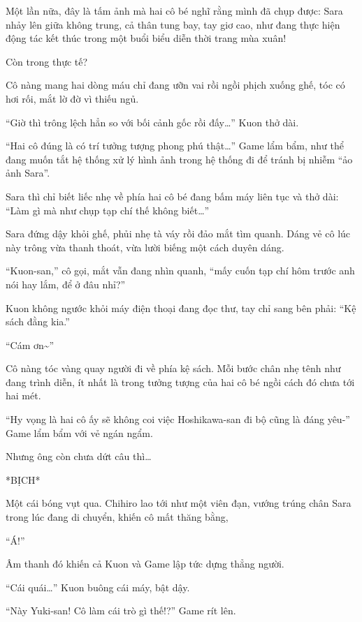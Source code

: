 \documentclass[../main.tex]{subfiles}
\begin{document}
Một lần nữa, đây là tấm ảnh mà hai cô bé nghĩ rằng mình đã chụp được: Sara nhảy lên giữa không trung, cả thân tung bay, tay giơ cao, như đang thực hiện động tác kết thúc trong một buổi biểu diễn thời trang mùa xuân!


Còn trong thực tế?

Cô nàng mang hai dòng máu chỉ đang ưỡn vai rồi ngồi phịch xuống ghế, tóc có hơi rối, mắt lờ đờ vì thiếu ngủ.

``Giờ thì trông lệch hẳn so với bối cảnh gốc rồi đấy\dots'' Kuon thở dài.

``Hai cô đúng là có trí tưởng tượng phong phú thật\dots'' Game lẩm bẩm, như thể đang muốn tắt hệ thống xử lý hình ảnh trong hệ thống đi để tránh bị nhiễm ``ảo ảnh Sara''.

Sara thì chỉ biết liếc nhẹ về phía hai cô bé đang bấm máy liên tục và thở dài: ``Làm gì mà như chụp tạp chí thế không biết\dots''

\ct

Sara đứng dậy khỏi ghế, phủi nhẹ tà váy rồi đảo mắt tìm quanh. Dáng vẻ cô lúc này trông vừa thanh thoát, vừa lười biếng một cách duyên dáng.

``Kuon-san,'' cô gọi, mắt vẫn đang nhìn quanh, ``mấy cuốn tạp chí hôm trước anh nói hay lắm, để ở đâu nhỉ?''

Kuon không ngước khỏi máy điện thoại đang đọc thư, tay chỉ sang bên phải: ``Kệ sách đằng kia.''

``Cám ơn\~{}''

Cô nàng tóc vàng quay người đi về phía kệ sách. Mỗi bước chân nhẹ tênh như đang trình diễn, ít nhất là trong tưởng tượng của hai cô bé ngồi cách đó chưa tới hai mét.

``Hy vọng là hai cô ấy sẽ không coi việc Hoshikawa-san đi bộ cũng là đáng yêu-'' Game lẩm bẩm với vẻ ngán ngẩm.

Nhưng ông còn chưa dứt câu thì\dots

*BỊCH*

Một cái bóng vụt qua. Chihiro lao tới như một viên đạn, vướng trúng chân Sara trong lúc đang di chuyển, khiến cô mất thăng bằng,


``Á!''

Âm thanh đó khiến cả Kuon và Game lập tức dựng thẳng người.

``Cái quái\dots'' Kuon buông cái máy, bật dậy.

``Này Yuki-san! Cô làm cái trò gì thế!?'' Game rít lên.
\end{document}
